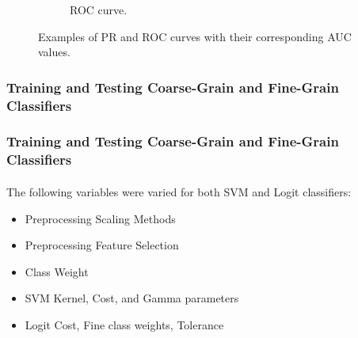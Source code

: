 \documentclass{beamer}
\begin{document}
\begin{frame}[noframenumbering]
\begin{figure}[!htb]
\begin{subfigure}[t]{0.5\textwidth}
            \caption{ROC curve.}
        \end{subfigure}
        \caption{Examples of PR and ROC curves with their corresponding AUC values.}
        \label{fig:PRRocExamples}
    \end{figure}
\end{frame}
\begin{frame}[noframenumbering]
    \frametitle{Training and Testing Coarse-Grain
    and Fine-Grain Classifiers}  %
    \framesubtitle{}
    \begin{table}[H]
      \centering
        \caption{Number of proteins in each partition:}
        \label{tab:partitions}
    \end{table}
\end{frame}
\begin{frame}[noframenumbering]
    \frametitle{Training and Testing Coarse-Grain and Fine-Grain Classifiers}  %
    \framesubtitle{}
     \par The following variables were varied for both SVM and Logit classifiers:
    \begin{itemize}
      \item Preprocessing Scaling Methods
      \item Preprocessing Feature Selection
      \item Class Weight
      \item SVM Kernel, Cost, and Gamma parameters
      \item Logit Cost, Fine class weights, Tolerance
    \end{itemize}
\end{frame}
\end{document}

